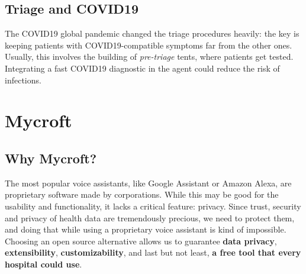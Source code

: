 \documentclass[conference]{IEEEtran}
\begin{document}
\subsection{Triage and COVID19}
\label{COVID}
The COVID19 global pandemic changed the triage procedures heavily: the key is keeping patients with COVID19-compatible symptoms far from the other ones\cite{10.1093/jamia/ocaa01}. Usually, this involves the building of \textit{pre-triage} tents, where patients get tested. Integrating a fast COVID19 diagnostic in the agent could reduce the risk of infections.
\section{Mycroft}
\label{sec:mycroft}
\subsection{Why Mycroft?}
The most popular voice assistants, like Google Assistant or Amazon Alexa, are proprietary software made by corporations. While this may be good for the usability and functionality, it lacks a critical feature: privacy. Since trust, security and privacy of health data are tremendously precious, we need to protect them, and doing that while using a proprietary voice assistant is kind of impossible. Choosing an open source alternative allows us to guarantee \textbf{data privacy}, \textbf{extensibility}, \textbf{customizability}, and last but not least, \textbf{a free tool that every hospital could use}.
\end{document}
